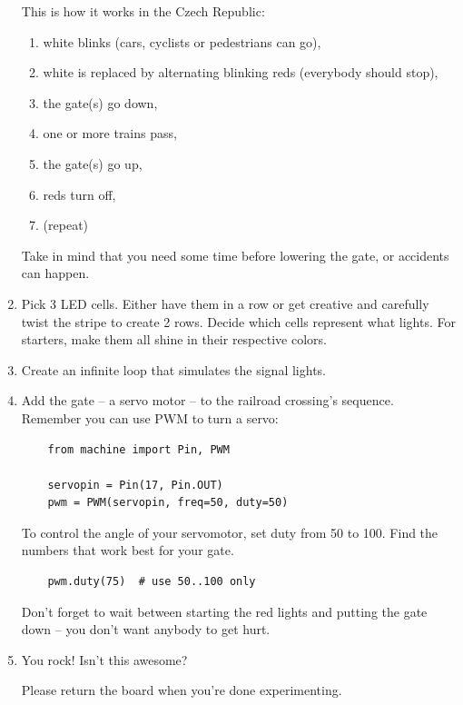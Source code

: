 \documentclass{../tutorial}
\begin{document}
\begin{enumerate}
    This is how it works in the Czech Republic:

    \begin{enumerate}
    \item white blinks (cars, cyclists or pedestrians can go),
    \item white is replaced by alternating blinking reds
          (everybody should stop),
    \item the gate(s) go down,
    \item one or more trains pass,
    \item the gate(s) go up,
    \item reds turn off,
    \item (repeat)
    \end{enumerate}

    Take in mind that you need some time before lowering the gate,
    or accidents can happen.

\item
    Pick 3 LED cells.
    Either have them in a row or get creative and carefully twist the stripe
    to create 2 rows.
    Decide which cells represent what lights.
    For starters, make them all shine in their respective colors.

\item
    Create an infinite loop that simulates the signal lights.

\item
    Add the gate – a servo motor – to the railroad crossing's sequence.
    Remember you can use PWM to turn a servo:

    \begin{lstlisting}
    from machine import Pin, PWM

    servopin = Pin(17, Pin.OUT)
    pwm = PWM(servopin, freq=50, duty=50)
    \end{lstlisting}

    To control the angle of your servomotor, set duty from 50 to 100.
    Find the numbers that work best for your gate.

    \begin{lstlisting}
    pwm.duty(75)  # use 50..100 only
    \end{lstlisting}

    Don't forget to wait between starting the red lights and putting the gate down –
    you don't want anybody to get hurt.

\item
    You rock! Isn't this awesome?

    Please return the board when you're done experimenting.

\end{enumerate}
\end{document}
